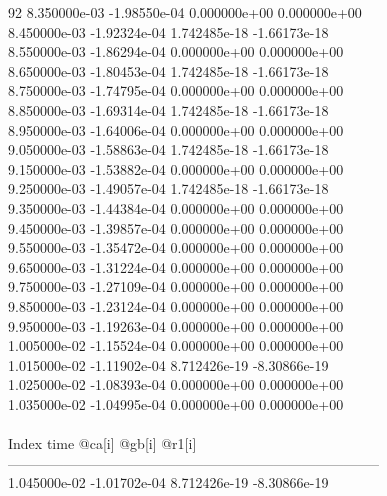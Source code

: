 92	8.350000e-03	-1.98550e-04	0.000000e+00	0.000000e+00	\\ 	8.450000e-03	-1.92324e-04	1.742485e-18	-1.66173e-18	\\ 	8.550000e-03	-1.86294e-04	0.000000e+00	0.000000e+00	\\ 	8.650000e-03	-1.80453e-04	1.742485e-18	-1.66173e-18	\\ 	8.750000e-03	-1.74795e-04	0.000000e+00	0.000000e+00	\\ 	8.850000e-03	-1.69314e-04	1.742485e-18	-1.66173e-18	\\ 	8.950000e-03	-1.64006e-04	0.000000e+00	0.000000e+00	\\ 	9.050000e-03	-1.58863e-04	1.742485e-18	-1.66173e-18	\\ 	9.150000e-03	-1.53882e-04	0.000000e+00	0.000000e+00	\\ 	9.250000e-03	-1.49057e-04	1.742485e-18	-1.66173e-18	\\ 	9.350000e-03	-1.44384e-04	0.000000e+00	0.000000e+00	\\ 	9.450000e-03	-1.39857e-04	0.000000e+00	0.000000e+00	\\ 	9.550000e-03	-1.35472e-04	0.000000e+00	0.000000e+00	\\ 	9.650000e-03	-1.31224e-04	0.000000e+00	0.000000e+00	\\ 	9.750000e-03	-1.27109e-04	0.000000e+00	0.000000e+00	\\ 	9.850000e-03	-1.23124e-04	0.000000e+00	0.000000e+00	\\ 	9.950000e-03	-1.19263e-04	0.000000e+00	0.000000e+00	\\ 	1.005000e-02	-1.15524e-04	0.000000e+00	0.000000e+00	\\ 	1.015000e-02	-1.11902e-04	8.712426e-19	-8.30866e-19	\\ 	1.025000e-02	-1.08393e-04	0.000000e+00	0.000000e+00	\\ 	1.035000e-02	-1.04995e-04	0.000000e+00	0.000000e+00	\\ \hline
\\ \hline
Index   time            @ca[i]          @gb[i]          @r1[i]          \\ \hline
--------------------------------------------------------------------------------\\ 	1.045000e-02	-1.01702e-04	8.712426e-19	-8.30866e-19	\\ \hline
